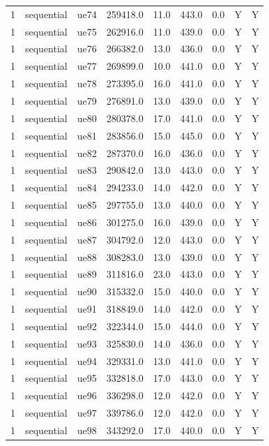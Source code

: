 \begin{table}[ht]
\begin{tabular}{|c|c|c|c|c|c|c|c|c|}
1 & sequential & ue74 & 259418.0 & 11.0 & 443.0 & 0.0 & Y & Y \\
1 & sequential & ue75 & 262916.0 & 11.0 & 439.0 & 0.0 & Y & Y \\
1 & sequential & ue76 & 266382.0 & 13.0 & 436.0 & 0.0 & Y & Y \\
1 & sequential & ue77 & 269899.0 & 10.0 & 441.0 & 0.0 & Y & Y \\
1 & sequential & ue78 & 273395.0 & 16.0 & 441.0 & 0.0 & Y & Y \\
1 & sequential & ue79 & 276891.0 & 13.0 & 439.0 & 0.0 & Y & Y \\
1 & sequential & ue80 & 280378.0 & 17.0 & 441.0 & 0.0 & Y & Y \\
1 & sequential & ue81 & 283856.0 & 15.0 & 445.0 & 0.0 & Y & Y \\
1 & sequential & ue82 & 287370.0 & 16.0 & 436.0 & 0.0 & Y & Y \\
1 & sequential & ue83 & 290842.0 & 13.0 & 443.0 & 0.0 & Y & Y \\
1 & sequential & ue84 & 294233.0 & 14.0 & 442.0 & 0.0 & Y & Y \\
1 & sequential & ue85 & 297755.0 & 13.0 & 440.0 & 0.0 & Y & Y \\
1 & sequential & ue86 & 301275.0 & 16.0 & 439.0 & 0.0 & Y & Y \\
1 & sequential & ue87 & 304792.0 & 12.0 & 443.0 & 0.0 & Y & Y \\
1 & sequential & ue88 & 308283.0 & 13.0 & 439.0 & 0.0 & Y & Y \\
1 & sequential & ue89 & 311816.0 & 23.0 & 443.0 & 0.0 & Y & Y \\
1 & sequential & ue90 & 315332.0 & 15.0 & 440.0 & 0.0 & Y & Y \\
1 & sequential & ue91 & 318849.0 & 14.0 & 442.0 & 0.0 & Y & Y \\
1 & sequential & ue92 & 322344.0 & 15.0 & 444.0 & 0.0 & Y & Y \\
1 & sequential & ue93 & 325830.0 & 14.0 & 436.0 & 0.0 & Y & Y \\
1 & sequential & ue94 & 329331.0 & 13.0 & 441.0 & 0.0 & Y & Y \\
1 & sequential & ue95 & 332818.0 & 17.0 & 443.0 & 0.0 & Y & Y \\
1 & sequential & ue96 & 336298.0 & 12.0 & 442.0 & 0.0 & Y & Y \\
1 & sequential & ue97 & 339786.0 & 12.0 & 442.0 & 0.0 & Y & Y \\
1 & sequential & ue98 & 343292.0 & 17.0 & 440.0 & 0.0 & Y & Y \\

\end{tabular}
\end{table}
